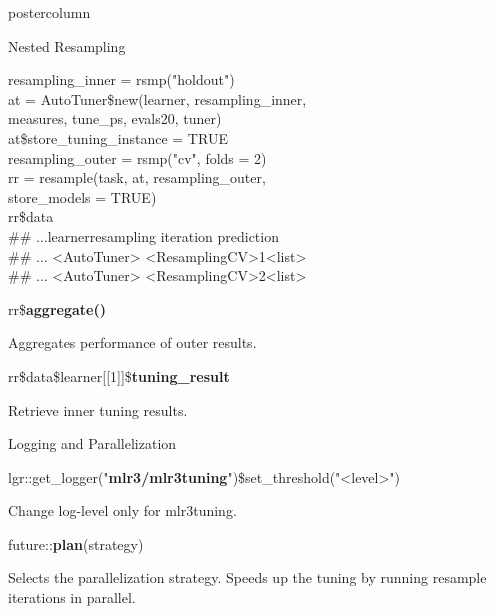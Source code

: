 \documentclass{beamer}
\newcommand{\monospace}[1]{\multido{}{#1}{\space}}
\begin{document}
\begin{frame}[fragile]{}
\begin{columns}
\begin{column}{.245\textwidth}
\begin{beamercolorbox}[center]{postercolumn}
\begin{minipage}{.98\textwidth}
{\begin{myblock}{Nested Resampling}
							\\
							\begin{codeboxexample}
								{\scriptsize
									resampling\_inner = rsmp("holdout")
									\vspace{1em}
									\\
									at = AutoTuner\$new(learner, resampling\_inner, \\
									\hspace*{1ex}measures, tune\_ps, evals20, tuner) \\
									at\$store\_tuning\_instance = TRUE
									\vspace{1em}
									\\
									resampling\_outer = rsmp("cv", folds = 2)\\
									rr = resample(task, at, resampling\_outer, \\
									\hspace*{1ex}store\_models = TRUE)
									\vspace{1em}
									\\
									rr\$data\\
									\#\# ...\monospace{3}learner\monospace{5}resampling iteration
									prediction\\
									\#\# ... <AutoTuner> <ResamplingCV>\monospace{9}1\monospace{5}<list>\\
									\#\# ... <AutoTuner> <ResamplingCV>\monospace{9}2\monospace{5}<list>}
							\end{codeboxexample}
							\vspace{1em}
							\begin{codebox}
								rr\$\textbf{aggregate()}
							\end{codebox}
							Aggregates performance of outer results.
							\\
							\begin{codebox}
								rr\$data\$learner[[1]]\$\textbf{tuning\_result}
							\end{codebox}
							Retrieve inner tuning results.
						\end{myblock}
						\begin{myblock}{Logging and Parallelization}
							\begin{codebox}
								{\scriptsize
									lgr::get\_logger("\textbf{mlr3/mlr3tuning}")\$set\_threshold("<level>")}
							\end{codebox}
							Change log-level only for mlr3tuning.\\
							\begin{codebox}
								future::\textbf{plan}(strategy)
							\end{codebox}
							Selects the parallelization strategy.
							Speeds up the tuning by running resample iterations in parallel.
						\end{myblock}
						\vfill}
				\end{minipage}
			\end{beamercolorbox}
		\end{column}
	\end{columns}
\end{frame}
\end{document}

